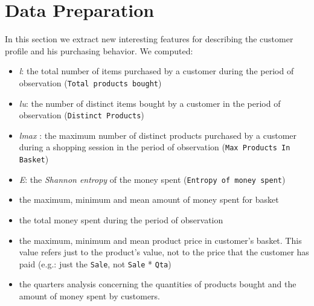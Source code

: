 \documentclass[12pt]{article}
\begin{document}
\section{Data Preparation}
In this section we extract new interesting features for describing the customer profile and his purchasing behavior.
We computed:
\begin{itemize}
    \item \textit{l}: the total number of items purchased by a customer during the period of observation (\texttt{Total products bought})
    \item \textit{lu}: the number of distinct items bought by a customer in the period of observation (\texttt{Distinct Products})
    \item \textit{lmax} : the maximum number of distinct products purchased by a customer during a shopping session  in the period of observation (\texttt{Max Products In Basket})
    \item \textit{E}: the \textit{Shannon entropy} of the money spent (\texttt{Entropy of money spent})
    \item the maximum, minimum and mean amount of money spent for basket
    \item the total money spent during the period of observation
    \item the maximum, minimum and mean product price in customer's basket. This value refers just to the product's value, not to the price that the customer has paid (e.g.: just the \texttt{Sale}, not \texttt{Sale} * \texttt{Qta})
    \item the quarters analysis concerning the quantities of products bought and the amount of money spent by customers.
\end{itemize}
\end{document}
